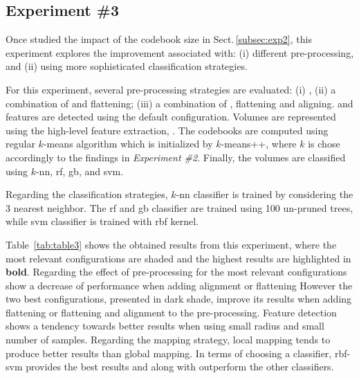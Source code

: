 \subsection{Experiment \#3}\label{subsec:exp3}
%
%
%
%

Once studied the impact of the codebook size in Sect.\,\ref{subsec:exp2}, this experiment explores the improvement associated with: (i) different pre-processing, and (ii) using more sophisticated classification strategies.

For this experiment, several pre-processing strategies are evaluated: (i) \nlm, (ii) a combination of \nlm and flattening; (iii) a combination of \nlm, flattening and aligning.
\lbp and \lbptop features are detected using the default configuration.
Volumes are represented using the high-level feature extraction, \bow. The codebooks are computed using regular $k$-means algorithm which is initialized by $k$-means++, where $k$ is chose accordingly to the findings in \emph{Experiment \#2}.
Finally, the volumes are classified using $k$-\ac{nn}, \ac{rf}, \ac{gb}, and \ac{svm}.

Regarding the classification strategies, $k$-\ac{nn} classifier is trained by considering the 3 nearest neighbor.
The \ac{rf} and \ac{gb} classifier are trained using 100 un-pruned trees, while \ac{svm} classifier is trained with \ac{rbf} kernel.

Table~\ref{tab:table3} shows the obtained results from this experiment, where the most relevant configurations are shaded and the highest results are highlighted in \textbf{bold}.
Regarding the effect of pre-processing for the most relevant configurations show a decrease of performance when adding alignment or flattening
However the two best configurations, presented in dark shade, improve its results when adding flattening or flattening and alignment to the pre-processing.
Feature detection shows a tendency towards better results when using small radius and small number of samples.
Regarding the mapping strategy, local mapping tends to produce better results than global mapping.
In terms of choosing a classifier, \ac{rbf}-\ac{svm} provides the best results and along with \rf outperform the other classifiers.

